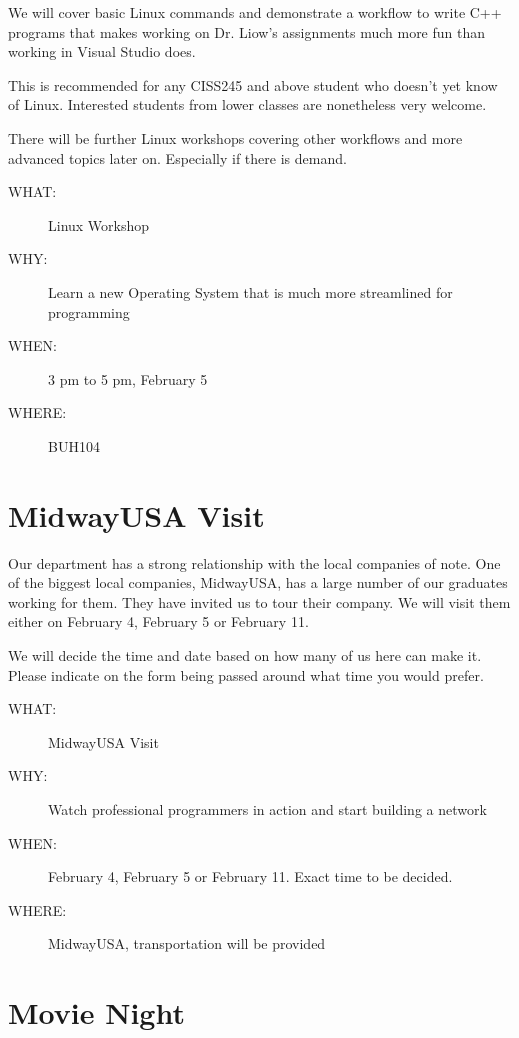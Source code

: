 We will cover basic Linux commands and demonstrate a workflow to write C++
programs that makes working on Dr. Liow's assignments much more fun than
working in Visual Studio does.

This is recommended for any CISS245 and above student who doesn't yet know of
Linux. Interested students from lower classes are nonetheless very welcome.

There will be further Linux workshops covering other workflows and more advanced
topics later on. Especially if there is demand.

\begin{description}
\item[{WHAT:}] Linux Workshop
\item[{WHY:}] Learn a new Operating System that is much more streamlined for programming
\item[{WHEN:}] 3 pm to 5 pm, February 5
\item[{WHERE:}] BUH104
\end{description}


\newpage


\section{MidwayUSA Visit}
\label{sec-5}

Our department has a strong relationship with the local companies of note. One
of the biggest local companies, MidwayUSA, has a large number of our graduates
working for them. They have invited us to tour their company. We will visit
them either on February 4, February 5 or February 11. 

We will decide the time and date based on how many of us here can make
it. Please indicate on the form being passed around what time you would prefer.

\begin{description}
\item[{WHAT:}] MidwayUSA Visit
\item[{WHY:}] Watch professional programmers in action and start building a network
\item[{WHEN:}] February 4, February 5 or February 11. Exact time to be decided.
\item[{WHERE:}] MidwayUSA, transportation will be provided
\end{description}


\newpage


\section{Movie Night}
\label{sec-6}


